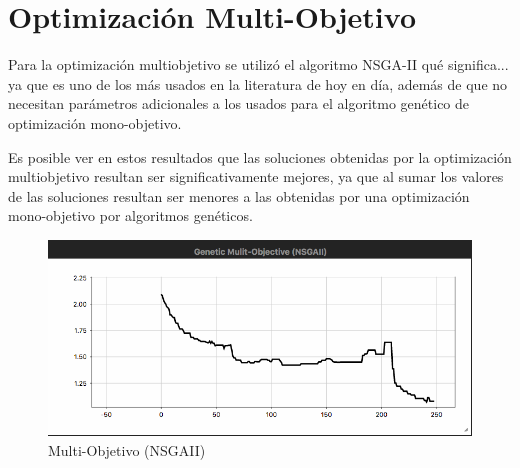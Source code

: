 \section{Optimización Multi-Objetivo}

Para la optimización multiobjetivo se utilizó el algoritmo NSGA-II qué significa... ya que es uno de los más usados en la literatura de hoy en día, además de que no necesitan parámetros adicionales a los usados para el algoritmo genético de optimización mono-objetivo.

Es posible ver en estos resultados que las soluciones obtenidas por la optimización multiobjetivo resultan ser significativamente mejores, ya que al sumar los valores de las soluciones resultan ser menores a las obtenidas por una optimización mono-objetivo por algoritmos genéticos.

\begin{figure}
    \centering
    \includegraphics[width=150mm]{Multi-Objective.png}
    \caption{Multi-Objetivo (NSGAII)}
    \label{fig:multiobjetivo}
\end{figure}
